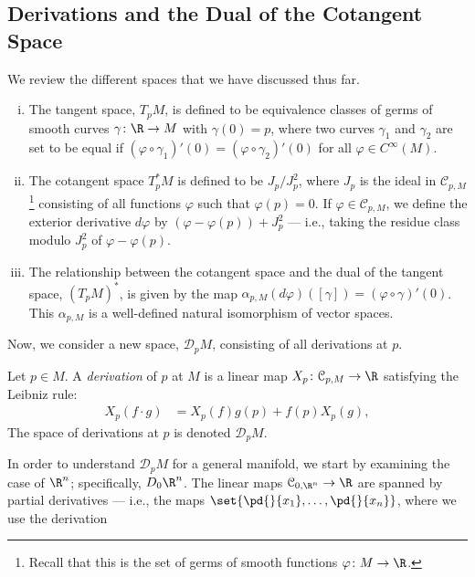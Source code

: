 \documentclass[10pt]{mypackage}
\begin{document}
\subsection{Derivations and the Dual of the Cotangent Space}%
We review the different spaces that we have discussed thus far.
\begin{enumerate}[(i)]
  \item The tangent space, $T_pM$, is defined to be equivalence classes of germs of smooth curves $\gamma\colon \R\rightarrow M$ with $\gamma\left( 0 \right)=  p$, where two curves $\gamma_1$ and $\gamma_2$ are set to be equal if $\left( \varphi\circ \gamma_1 \right)'(0) = \left( \varphi\circ \gamma_2 \right)'(0)$ for all $\varphi\in C^{\infty}\left( M \right)$.
  \item The cotangent space $T_p^{\ast}M$ is defined to be $J_p/J_p^2$, where $J_p$ is the ideal in $\mathcal{C}_{p,M}$\footnote{Recall that this is the set of germs of smooth functions $\varphi\colon M\rightarrow \R$.} consisting of all functions $\varphi$ such that $\varphi(p) = 0$. If $\varphi\in \mathcal{C}_{p,M}$, we define the exterior derivative $d\varphi$ by $ \left( \varphi-\varphi(p) \right) + J_p^2 $ --- i.e., taking the residue class modulo $J_p^2$ of $\varphi - \varphi(p)$.
  \item The relationship between the cotangent space and the dual of the tangent space, $\left( T_pM \right)^{\ast}$, is given by the map $\alpha_{p,M}\left( d\varphi \right)\left( \left[ \gamma \right] \right) = \left( \varphi\circ \gamma \right)'(0)$. This $\alpha_{p,M}$ is a well-defined natural isomorphism of vector spaces.
\end{enumerate}
Now, we consider a new space, $ \mathcal{D}_p M$, consisting of all derivations at $p$.
\begin{definition}
  Let $p\in M$. A \textit{derivation} of $p$ at $M$ is a linear map $X_p\colon \mathcal{C}_{p,M}\rightarrow \R$ satisfying the Leibniz rule:
  \begin{align*}
    X_p\left( f\cdot g \right) &= X_p\left( f \right)g(p) + f(p)X_p(g),
  \end{align*}
  The space of derivations at $p$ is denoted $\mathcal{D}_pM$.
\end{definition}
In order to understand $\mathcal{D}_pM$ for a general manifold, we start by examining the case of $\R^{n}$; specifically, $D_0\R^{n}$. The linear maps $\mathcal{C}_{0,\R^n}\rightarrow \R$ are spanned by partial derivatives --- i.e., the maps $\set{ \pd{}{x_1},\dots, \pd{}{x_n} }$, where we use the derivation
\end{document}
